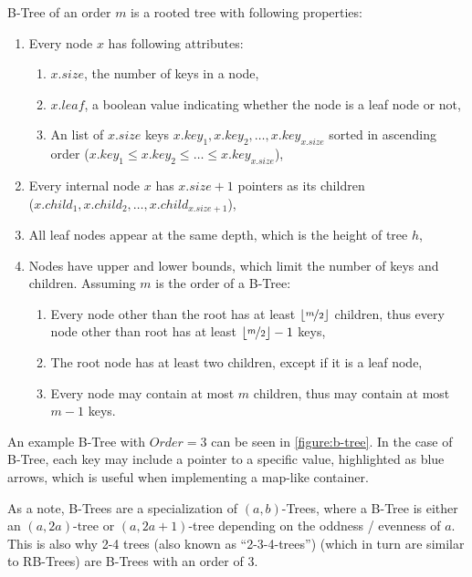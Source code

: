 \begin{definition}\label{def:btree}
  B-Tree of an order $m$ is a rooted tree with following properties:
  \begin{enumerate}
    \item Every node $x$ has following attributes:
          \begin{enumerate}
            \item $x.\mathit{size}$, the number of keys in a node,
            \item $x.\mathit{leaf}$, a boolean value indicating whether the node is a leaf node or not,
            \item An list of $x.\mathit{size}$ keys $x.\mathit{key}_1, x.\mathit{key}_2, \dots, x.\mathit{key}_{x.size}$ sorted in ascending order ($x.\mathit{key}_1 \le x.\mathit{key}_2 \le \dots \le x.\mathit{key}_{x.\mathit{size}}$),
          \end{enumerate}
    \item Every internal node $x$ has $x.size + 1$ pointers as its children \\($x.child_1, x.child_2, \dots, x.child_{x.size + 1}$),
    \item All leaf nodes appear at the same depth, which is the height of tree $h$,
    \item Nodes have upper and lower bounds, which limit the number of keys and children. Assuming $m$ is the order of a B-Tree:
          \begin{enumerate}
            \item Every node other than the root has at least $\lfloor\nicefrac{m}{2}\rfloor$ children, thus every node other than root has at least $\lfloor\nicefrac{m}{2}\rfloor - 1$ keys,
            \item The root node has at least two children, except if it is a leaf node,
            \item Every node may contain at most $m$ children, thus may contain at most $m - 1$ keys.
          \end{enumerate}
  \end{enumerate}
\end{definition}

An example B-Tree with $\mathit{Order} = 3$ can be seen in \cref{figure:b-tree}. In the case of B-Tree, each key may include a pointer to a specific value, highlighted as blue arrows, which is useful when implementing a map-like container.

As a note, B-Trees are a specialization of $(a,b)$-Trees, where a B-Tree is either an $(a, 2a)$-tree or $(a, 2a + 1)$-tree depending on the oddness / evenness of $a$. This is also why 2-4 trees (also known as \enquote{2-3-4-trees}) (which in turn are similar to RB-Trees) are B-Trees with an order of 3.

